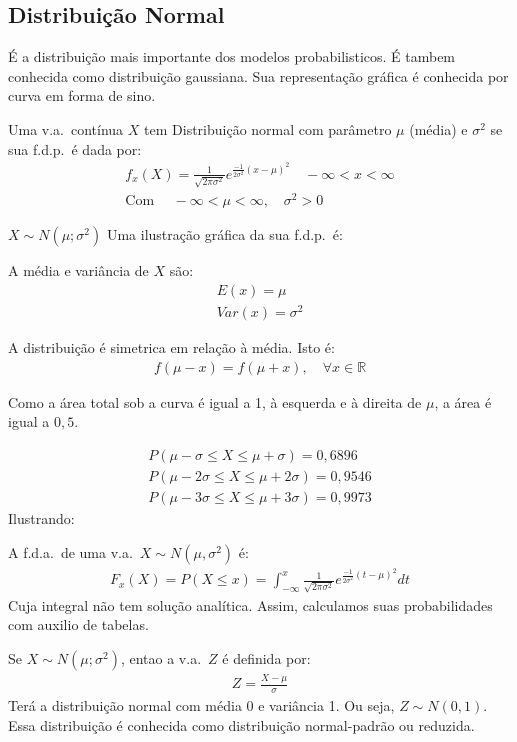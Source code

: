 \subsection{Distribuição Normal}
É a distribuição mais importante dos modelos probabilisticos. É tambem conhecida como distribuição gaussiana. Sua representação gráfica é conhecida por curva em forma de sino.
\begin{description}
  \item [Definição]  Uma v.a.\ contínua $X$ tem Distribuição normal com parâmetro $\mu$ (média) e 
    $\sigma^2$ se sua f.d.p.\ é dada por:
    \begin{align}
      f_{x} (X)= \frac{1}{\sqrt{2\pi \sigma^2}} e^{\frac{-1}{2\sigma^2} \left( x-\mu \right)^2} \quad -\infty<x<\infty \\
      \text{Com } \quad -\infty < \mu < \infty, \quad \sigma^2>0
    \end{align}
  \item [Notação] $X \sim N(\mu ; \sigma^2)$
Uma ilustração gráfica da sua f.d.p.\ é:
\begin{figure}[H]
  \centering
  
\end{figure}
A média e variância de $X$ são:
\begin{align*}
E(x) =\mu \\
Var(x)=\sigma^2
\end{align*}
\item [Propriedades]
A distribuição é simetrica em relação à média. Isto é:
\begin{align}
  f(\mu - x) = f(\mu+x), \quad \forall x \in \mathbb{R}
\end{align}
\item Como a área total sob a curva é igual a 1, à esquerda e à direita de $\mu$, 
  a área é igual a $0,5$.
\item 
  \begin{align*}
    P(\mu -\sigma \leq X \leq \mu+\sigma)= 0,6896\\
    P(\mu -2\sigma \leq X \leq \mu+2\sigma)= 0,9546\\
    P(\mu -3\sigma \leq X \leq \mu+3\sigma)= 0,9973
  \end{align*}
Ilustrando:
\begin{figure}[H]
  \centering
  
\end{figure}
A f.d.a.\ de uma v.a.\ $X \sim N(\mu,\sigma^2)$ é:
\begin{align*}
  F_{x} (X)= P(X \leq x)= \int^{x}_{-\infty} \frac{1}{\sqrt{2\pi \sigma^2}}e^{\frac{-1}{2\sigma^2} \left( t- \mu \right)^2} dt 
\end{align*}
Cuja integral não tem solução analítica. Assim, calculamos suas probabilidades com auxilio de tabelas.
\item [Definição] Se $X \sim N(\mu; \sigma^2)$, entao a v.a.\ $Z$ é definida por:
  \begin{align}
   Z= \frac{X-\mu}{\sigma} 
  \end{align}
  Terá a distribuição normal com média 0 e variância 1. Ou seja, $Z \sim N(0,1)$.
  Essa distribuição é conhecida como distribuição normal-padrão ou reduzida. 
\end{description}
